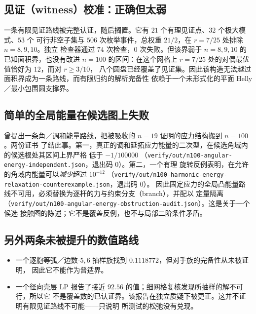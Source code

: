 \subsection{见证（witness）校准：正确但太弱}

一条有限见证路线被完整认证，随后搁置。它有 $21$ 个有理见证点、$32$ 个极大模式、$53$ 个
可行非空子集与 $506$ 次枚举事件，总权重 $21/2$，在 $r=7/25$ 处排除 $n=8,9,10$。独立
检查器通过 $74$ 次检查，$0$ 次失败。但该界弱于 $n=8,9,10$ 的已知面积界，也没有改进
$n=100$ 的区间：在这个网格上 $r=7/25$ 处的对偶最优值恰好为 $12$，而对 $r\ge3/10$，
八个圆盘已经覆盖了见证集。因此该构造无法越过面积界成为一条路线，而有限归约的解析完备性
依赖于一个未形式化的平面 Helly／最小包围圆支撑界。

\subsection{简单的全局能量在候选图上失败}

曾提出一条角／调和能量路线，把被吸收的 $n=19$ 证明的应力结构搬到 $n=100$。两份证书
了结此事。第一，真正的调和延拓应力能量的二次型，在候选角域内的候选根处其区间上界严格
低于 $-1/100000$
（{\footnotesize\texttt{verify/\allowbreak{}out/\allowbreak{}n100-\allowbreak{}angular-\allowbreak{}energy-\allowbreak{}independent.json}}，退出码 $0$）。第二，一个有理
旋转反例表明，在允许的角域内能量可以\emph{减少}超过 $10^{-12}$
（{\footnotesize\texttt{verify/\allowbreak{}out/\allowbreak{}n100-\allowbreak{}harmonic-\allowbreak{}energy-\allowbreak{}relaxation-\allowbreak{}counterexample.json}}，退出码 $0$）。
因此固定应力的全局凸能量路线不可用，必须替换为逐杆的力与约束分支（branch），并配以
定量隔离
（{\footnotesize\texttt{verify/\allowbreak{}out/\allowbreak{}n100-\allowbreak{}angular-\allowbreak{}energy-\allowbreak{}obstruction-\allowbreak{}audit.json}}）。这是关于一个候选
接触图的陈述；它不是覆盖反例，也不与局部二阶条件矛盾。

\subsection{另外两条未被提升的数值路线}

\begin{itemize}[leftmargin=1.4em,itemsep=2pt]
\item 一个逐胞等弧／边数-$5,6$ 抽样族找到 $0.1118772$，但对手族的完备性从未被证明，
因此它不能作为普适界。
\item 一个径向壳层 LP 报告了接近 $92.56$ 的值；细网格复核发现所抽样的解不可行，所以它
不是覆盖数的已认证界。该报告在独立质疑下被更正。这并不证明有限见证路线不可能——只说明
所测试的松弛没有兑现。
\end{itemize}

